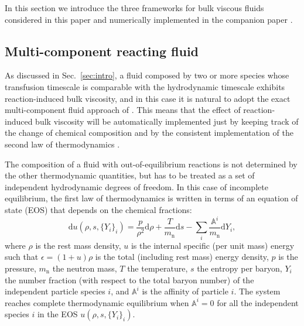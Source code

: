 \documentclass[aps,prd,twocolumn,a4paper,floatfix,nofootbib,superscriptaddress,nofootinbib]{revtex4}
\newcommand{\rn}{\mathrm{n}}
\begin{document}
In this section we introduce the three frameworks for bulk viscous fluids considered in
this paper and numerically implemented in the companion paper
\citep{Camelio22b, Camelio22code}.

\subsection{Multi-component reacting fluid}
\label{ssec:mcpf}

As discussed in Sec.~\ref{sec:intro}, a fluid composed by two or more species
whose transfusion timescale is comparable with the hydrodynamic timescale
exhibits reaction-induced bulk viscosity, and in this case it is natural to
adopt the exact multi-component fluid approach of \citet{carter1991}.  
This means that the effect of reaction-induced bulk viscosity will be automatically implemented just by
keeping track of the change of chemical composition and by the consistent
implementation of the second law of thermodynamics \citep{Gavassino21bulk}.

The composition of a fluid with out-of-equilibrium reactions is not
determined by the other thermodynamic quantities, but has to be treated as a
set of independent hydrodynamic degrees of freedom. In this case of incomplete equilibrium, the first
law of thermodynamics is written in terms of an equation of state (EOS) that depends on the chemical fractions:
%
\begin{equation}
\label{eq:eos-th}
\mathrm du(\rho,s,\{Y_i\}_i)=\frac{p}{\rho^2}\mathrm d\rho+\frac{T}{m_\rn}\mathrm ds
-\sum_i\frac{\mathbb A^i}{m_\rn}\mathrm dY_i,
\end{equation}
%
where $\rho$ is the rest mass density, $u$ is the internal specific (per unit
mass) energy such that $\epsilon=(1+u)\rho$ is the total (including rest mass)
energy density, $p$ is the pressure, $m_\rn$ the neutron mass, $T$ the
temperature, $s$ the entropy per baryon, $Y_i$ the number fraction (with
respect to the total baryon number) of the independent particle species $i$,
and $\mathbb A^i$ is the affinity of particle $i$.
The system reaches complete thermodynamic equilibrium when $\mathbb A^i=0$ for
all the independent species $i$ in the EOS $u(\rho,s,\{Y_i\}_i)$.
\end{document}
